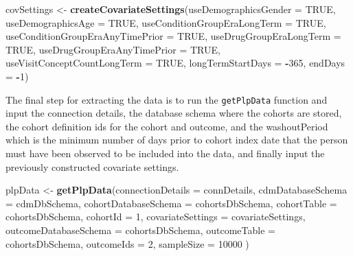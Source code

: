 \documentclass[11pt]{book}
\newenvironment{Shaded}{\begin{snugshade}}{\end{snugshade}}
\newcommand{\KeywordTok}[1]{\textcolor[rgb]{0.13,0.29,0.53}{\textbf{#1}}}
\newcommand{\DataTypeTok}[1]{\textcolor[rgb]{0.13,0.29,0.53}{#1}}
\newcommand{\DecValTok}[1]{\textcolor[rgb]{0.00,0.00,0.81}{#1}}
\newcommand{\StringTok}[1]{\textcolor[rgb]{0.31,0.60,0.02}{#1}}
\newcommand{\OtherTok}[1]{\textcolor[rgb]{0.56,0.35,0.01}{#1}}
\newcommand{\OperatorTok}[1]{\textcolor[rgb]{0.81,0.36,0.00}{\textbf{#1}}}
\newcommand{\NormalTok}[1]{#1}
\begin{document}
\begin{Shaded}
\begin{Highlighting}[]
\NormalTok{covSettings <-}\StringTok{ }\KeywordTok{createCovariateSettings}\NormalTok{(}\DataTypeTok{useDemographicsGender =} \OtherTok{TRUE}\NormalTok{,}
                                       \DataTypeTok{useDemographicsAge =} \OtherTok{TRUE}\NormalTok{,}
                                       \DataTypeTok{useConditionGroupEraLongTerm =} \OtherTok{TRUE}\NormalTok{,}
                                       \DataTypeTok{useConditionGroupEraAnyTimePrior =} \OtherTok{TRUE}\NormalTok{,}
                                       \DataTypeTok{useDrugGroupEraLongTerm =} \OtherTok{TRUE}\NormalTok{,}
                                       \DataTypeTok{useDrugGroupEraAnyTimePrior =} \OtherTok{TRUE}\NormalTok{,}
                                       \DataTypeTok{useVisitConceptCountLongTerm =} \OtherTok{TRUE}\NormalTok{,}
                                       \DataTypeTok{longTermStartDays =} \OperatorTok{-}\DecValTok{365}\NormalTok{,}
                                       \DataTypeTok{endDays =} \OperatorTok{-}\DecValTok{1}\NormalTok{)}
\end{Highlighting}
\end{Shaded}

The final step for extracting the data is to run the \texttt{getPlpData}
function and input the connection details, the database schema where the
cohorts are stored, the cohort definition ids for the cohort and
outcome, and the washoutPeriod which is the minimum number of days prior
to cohort index date that the person must have been observed to be
included into the data, and finally input the previously constructed
covariate settings.

\begin{Shaded}
\begin{Highlighting}[]
\NormalTok{plpData <-}\StringTok{ }\KeywordTok{getPlpData}\NormalTok{(}\DataTypeTok{connectionDetails =}\NormalTok{ connDetails,}
                      \DataTypeTok{cdmDatabaseSchema =}\NormalTok{ cdmDbSchema,}
                      \DataTypeTok{cohortDatabaseSchema =}\NormalTok{ cohortsDbSchema,}
                      \DataTypeTok{cohortTable =}\NormalTok{ cohortsDbSchema,}
                      \DataTypeTok{cohortId =} \DecValTok{1}\NormalTok{,}
                      \DataTypeTok{covariateSettings =}\NormalTok{ covariateSettings,}
                      \DataTypeTok{outcomeDatabaseSchema =}\NormalTok{ cohortsDbSchema,}
                      \DataTypeTok{outcomeTable =}\NormalTok{ cohortsDbSchema,}
                      \DataTypeTok{outcomeIds =} \DecValTok{2}\NormalTok{,}
                      \DataTypeTok{sampleSize =} \DecValTok{10000}
\NormalTok{)}
\end{Highlighting}
\end{Shaded}
\end{document}
